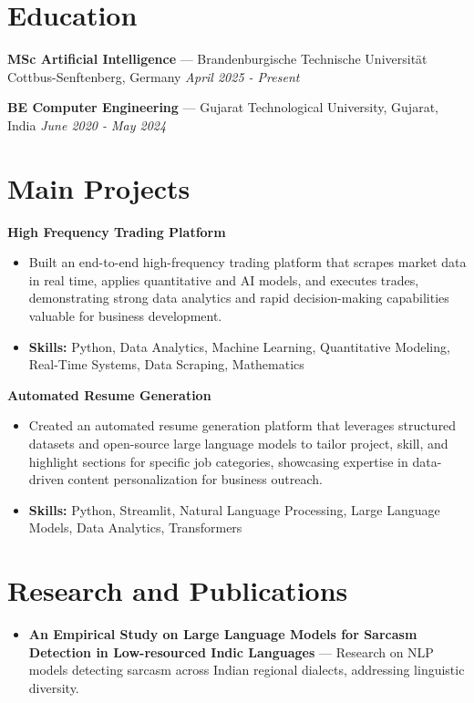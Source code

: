 \documentclass[a4paper,10pt]{article}
\begin{document}
\section*{Education}
\textbf{MSc Artificial Intelligence} — Brandenburgische Technische Universität Cottbus-Senftenberg, Germany \hfill \textit{April 2025 - Present}\par
\vspace{1.5pt}
\textbf{BE Computer Engineering} — Gujarat Technological University, Gujarat, India \hfill \textit{June 2020 - May 2024}\par

\section*{Main Projects}
\textbf{High Frequency Trading Platform}\par
\vspace{1pt}
\begin{itemize}
  \item Built an end-to-end high-frequency trading platform that scrapes market data in real time, applies quantitative and AI models, and executes trades, demonstrating strong data analytics and rapid decision-making capabilities valuable for business development.
  \item \textbf{Skills:} Python, Data Analytics, Machine Learning, Quantitative Modeling, Real-Time Systems, Data Scraping, Mathematics
\end{itemize}
\vspace{3pt}
\textbf{Automated Resume Generation}\par
\vspace{1pt}
\begin{itemize}
  \item Created an automated resume generation platform that leverages structured datasets and open-source large language models to tailor project, skill, and highlight sections for specific job categories, showcasing expertise in data-driven content personalization for business outreach.
  \item \textbf{Skills:} Python, Streamlit, Natural Language Processing, Large Language Models, Data Analytics, Transformers
\end{itemize}

\section*{Research and Publications}
\begin{itemize}
\item \textbf{An Empirical Study on Large Language Models for Sarcasm Detection in Low-resourced Indic Languages} — Research on NLP models detecting sarcasm across Indian regional dialects, addressing linguistic diversity.
\end{itemize}
\end{document}
